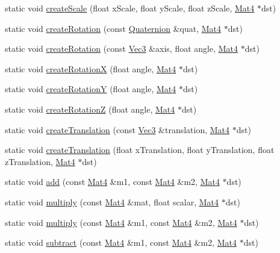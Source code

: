 \begin{DoxyCompactItemize}
\item 
static void \hyperlink{classMat4_a73ac7c88b7d1f1b3105cee306c3bbfde}{create\+Scale} (float x\+Scale, float y\+Scale, float z\+Scale, \hyperlink{classMat4}{Mat4} $\ast$dst)
\item 
static void \hyperlink{classMat4_ac9306beb73b9ccf0ecec151fa1e34a24}{create\+Rotation} (const \hyperlink{classQuaternion}{Quaternion} \&quat, \hyperlink{classMat4}{Mat4} $\ast$dst)
\item 
static void \hyperlink{classMat4_ae4fab56ac8716d22d8fb979e756291c6}{create\+Rotation} (const \hyperlink{classVec3}{Vec3} \&axis, float angle, \hyperlink{classMat4}{Mat4} $\ast$dst)
\item 
static void \hyperlink{classMat4_a28de6fcc943bea256076687d934af3c0}{create\+RotationX} (float angle, \hyperlink{classMat4}{Mat4} $\ast$dst)
\item 
static void \hyperlink{classMat4_ab81524e7fbb339f6a7c5a43d701fdbc7}{create\+RotationY} (float angle, \hyperlink{classMat4}{Mat4} $\ast$dst)
\item 
static void \hyperlink{classMat4_a01b92c6d9e1d8706b2288f7159411207}{create\+RotationZ} (float angle, \hyperlink{classMat4}{Mat4} $\ast$dst)
\item 
static void \hyperlink{classMat4_a6c939bd684b051a2704da5ef9bcfd245}{create\+Translation} (const \hyperlink{classVec3}{Vec3} \&translation, \hyperlink{classMat4}{Mat4} $\ast$dst)
\item 
static void \hyperlink{classMat4_a4bd6bce87e0e3efbaa343898050bd47b}{create\+Translation} (float x\+Translation, float y\+Translation, float z\+Translation, \hyperlink{classMat4}{Mat4} $\ast$dst)
\item 
static void \hyperlink{classMat4_ab28d0b850806aff5bd96fdffb3faa5ba}{add} (const \hyperlink{classMat4}{Mat4} \&m1, const \hyperlink{classMat4}{Mat4} \&m2, \hyperlink{classMat4}{Mat4} $\ast$dst)
\item 
static void \hyperlink{classMat4_ab0a9f07ed2a1bb7f067a6d8dac759244}{multiply} (const \hyperlink{classMat4}{Mat4} \&mat, float scalar, \hyperlink{classMat4}{Mat4} $\ast$dst)
\item 
static void \hyperlink{classMat4_a3e9235b654f4bf59722d17d392cdddca}{multiply} (const \hyperlink{classMat4}{Mat4} \&m1, const \hyperlink{classMat4}{Mat4} \&m2, \hyperlink{classMat4}{Mat4} $\ast$dst)
\item 
static void \hyperlink{classMat4_aaf588424f8307071ccbb38be271cb76b}{subtract} (const \hyperlink{classMat4}{Mat4} \&m1, const \hyperlink{classMat4}{Mat4} \&m2, \hyperlink{classMat4}{Mat4} $\ast$dst)

\end{DoxyCompactItemize}
